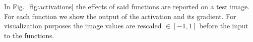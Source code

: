 In Fig.~\ref{fig:activations} the effects of said functions are reported on a test image.
For each function we show the output of the activation and its gradient.
For visualization purposes the image values are rescaled $\in[-1, 1]$ before the input to the functions.











